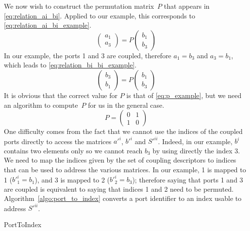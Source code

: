 We now wish to construct the permutation matrix~$P$ that appears in \cref{eq:relation_ai_bi}.
Applied to our example, this corresponds to \cref{eq:relation_ai_bi_example}.
\begin{equation}
    \begin{pmatrix}
        a_1 \\ a_3
    \end{pmatrix}
    =
    P
    \begin{pmatrix}
        b_1 \\ b_3
    \end{pmatrix}
    \label{eq:relation_ai_bi_example}
\end{equation}
In our example, the ports 1 and 3 are coupled, therefore $a_1 = b_3$ and $a_3 = b_1$, which leads to \cref{eq:relation_bi_bi_example}.
\begin{equation}
    \begin{pmatrix}
        b_3 \\ b_1
    \end{pmatrix}
    =
    P
    \begin{pmatrix}
        b_1 \\ b_3
    \end{pmatrix}
    \label{eq:relation_bi_bi_example}
\end{equation}
It is obvious that the correct value for $P$ is that of \cref{eq:p_example}, but we need an algorithm to compute~$P$ for us in the general case.
\begin{equation}
    P =
    \begin{pmatrix}
        0 & 1 \\
        1 & 0
    \end{pmatrix}
    \label{eq:p_example}
\end{equation}
One difficulty comes from the fact that we cannot use the indices of the coupled ports directly to access the matrices $a'^i$, $b'^i$ and $S'^{ii}$.
Indeed, in our example, $b^i$ contains two elements only so we cannot reach $b_3$ by using directly the index 3.
We need to map the indices given by the set of coupling descriptors to indices that can be used to address the various matrices.
In our example, 1 is mapped to 1 ($b'^i_1 = b_1$), and 3 is mapped to 2 ($b'^i_2 = b_3$); therefore saying that ports 1 and 3 are coupled is equivalent to saying that indices 1 and 2 need to be permuted.
Algorithm~\cref{algo:port_to_index} converts a port identifier to an index usable to address $S'^{ii}$.
\begin{algorithm}
    \caption{PortToIndex}
    \label{algo:port_to_index}
    \begin{algorithmic}
         
         
        \\ 
        \EndFunction
    \end{algorithmic}
\end{algorithm}

